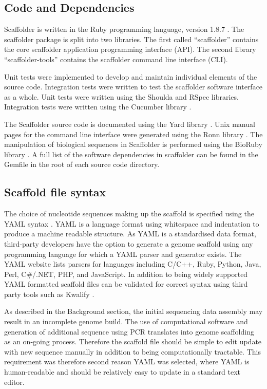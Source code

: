 \documentclass[10pt]{bmc_article}
\newenvironment{bmcformat}{\begin{raggedright}\baselineskip20pt\sloppy\setboolean{publ}{false}}{\end{raggedright}\baselineskip20pt\sloppy}
\begin{document}
\begin{bmcformat}
\subsection*{Code and Dependencies} %

Scaffolder is written in the Ruby programming language, version 1.8.7
\cite{ruby-lang}. The scaffolder package is split into two libraries. The first
called ``scaffolder'' contains the core scaffolder application programming
interface (API). The second library ``scaffolder-tools'' contains the
scaffolder command line interface (CLI). \pb

Unit tests were implemented to develop and maintain individual elements of the
source code.  Integration tests were written to test the scaffolder software
interface as a whole. Unit tests were written using the Shoulda and RSpec
\cite{rspec} libraries.  Integration tests were written using the Cucumber
library \cite{rspec}. \pb

The Scaffolder source code is documented using the Yard library \cite{yard}.
Unix manual pages for the command line interface were generated using the Ronn
library \cite{ronn}. The manipulation of biological sequences in Scaffolder is
performed using the BioRuby library \cite{goto2010}. A full list of the
software dependencies in scaffolder can be found in the Gemfile in the root of
each source code directory.\pb

\subsection*{Scaffold file syntax} %

The choice of nucleotide sequences making up the scaffold is specified using
the YAML syntax \cite{yaml}. YAML is a language format using whitespace and
indentation to produce a machine readable structure. As YAML is a standardised
data format, third-party developers have the option to generate a genome
scaffold using any programming language for which a YAML parser and generator
exists. The YAML website lists parsers for languages including C/C++, Ruby,
Python, Java, Perl, C\#/.NET, PHP, and JavaScript. In addition to being widely
supported YAML formatted scaffold files can be validated for correct syntax
using third party tools such as Kwalify \cite{kwalify}. \pb

As described in the Background section, the initial sequencing data assembly
may result in an incomplete genome build. The use of computational software and
generation of additional sequence using PCR translates into genome scaffolding
as an on-going process. Therefore the scaffold file should be simple to edit
update with new sequence manually in addition to being computationally
tractable. This requirement was therefore second reason YAML was selected,
where YAML is human-readable and should be relatively easy to update in a
standard text editor. \pb


\end{bmcformat}
\end{document}
